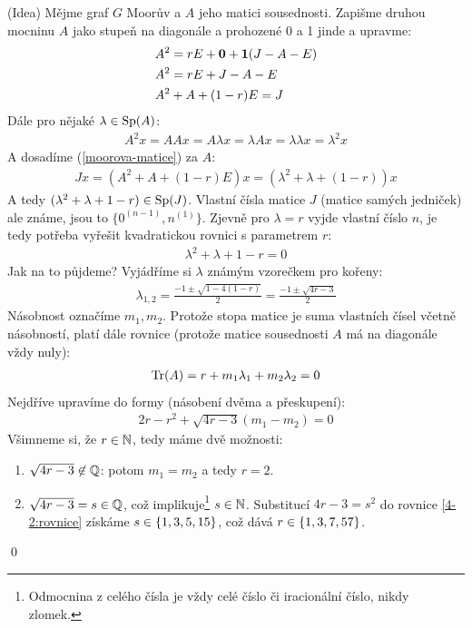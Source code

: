\dk (Idea) Mějme graf $G$ Moorův a $A$ jeho matici sousednosti. Zapišme druhou 
mocninu $A$ jako stupeň na diagonále a prohozené 0 a 1 jinde a upravme:
\begin{align}
	&A^2 = rE + {\bf0} + {\bf1}(J- A-E) \\
	&A^2 = rE + J - A - E \\
	\label{moorova-matice}&A^2 + A + (1-r)E = J
\end{align}
Dále pro nějaké $\lambda\in \operatorname{Sp}(A)$:
\begin{align}
	\label{moorova-mocnina}A^2 x = AAx = A\lambda x = \lambda A x = \lambda 
	\lambda x = \lambda^2 x
\end{align}
A dosadíme (\ref{moorova-matice}) za $A$:
\begin{align}
	Jx = (A^2 + A + (1-r)E)x = (\lambda^2 + \lambda + (1-r))x
\end{align}
A tedy $(\lambda^2 + \lambda + 1 -r) \in \operatorname{Sp}(J)$. Vlastní čísla matice $J$ 
(matice samých jedniček) ale známe, jsou to $\{0^{(n-1)}, n^{(1)}\}$. Zjevně pro 
$\lambda = r$ vyjde vlastní číslo $n$, je tedy potřeba vyřešit kvadratickou 
rovnici s parametrem $r$:
\begin{align}
	\lambda^2 + \lambda + 1 - r = 0
\end{align}
Jak na to půjdeme? Vyjádříme si $\lambda$ známým vzorečkem pro kořeny:
\begin{align}
	\lambda_{1,2} = \frac{-1\pm \sqrt{1-4(1-r)}}{2} = \frac{-1\pm\sqrt{4r-3}}{2}
\end{align}
Násobnost označíme $m_1, m_2$. Protože stopa matice je suma vlastních čísel 
včetně násobností, platí dále rovnice (protože matice sousednosti $A$ má na 
diagonále vždy nuly):
\begin{align}
	\operatorname{Tr}(A) = r+m_1\lambda_1 + m_2\lambda_2 = 0
\end{align}
Nejdříve
upravíme do formy (násobení dvěma a přeskupení):
\begin{align}
	2r - r^2 + \sqrt{4r-3}(m_1 - m_2) = 0 \label{4-2:rovnice}
\end{align}
Všimneme si, že $r\in\mathbb{N}$, tedy máme dvě možnosti:
\begin{enumerate}
	\item $\sqrt{4r-3} \not\in \mathbb{Q}$: potom $m_1 = m_2$ a tedy $r = 2$.
	\item $\sqrt{4r-3} = s \in \mathbb{Q}$, což implikuje\footnote{Odmocnina z celého čísla je
  vždy celé číslo či iracionální číslo, nikdy zlomek.} $s \in \mathbb{N}$.
  Substitucí $4r - 3 = s^2$ do rovnice \ref{4-2:rovnice} získáme
	$s \in \left\{1, 3, 5, 15\right\}$, což dává $r \in \left\{1, 3, 7, 57\right\}$.
\end{enumerate}
\qed


